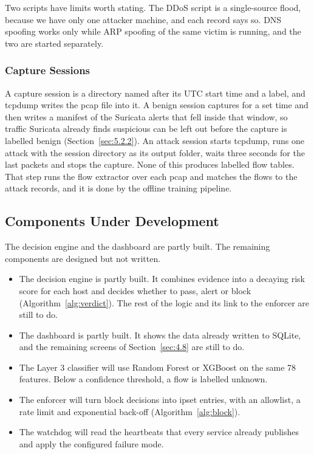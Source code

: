 \noindent Two scripts have limits worth stating. The DDoS script is a single-source flood, because we have only one attacker machine, and each record says so. DNS spoofing works only while ARP spoofing of the same victim is running, and the two are started separately.

\subsubsection{Capture Sessions}\label{sec:7.1.8.2}

\noindent A capture session is a directory named after its UTC start time and a label, and tcpdump writes the pcap file into it. A benign session captures for a set time and then writes a manifest of the Suricata alerts that fell inside that window, so traffic Suricata already finds suspicious can be left out before the capture is labelled benign (Section~\ref{sec:5.2.2}). An attack session starts tcpdump, runs one attack with the session directory as its output folder, waits three seconds for the last packets and stops the capture. None of this produces labelled flow tables. That step runs the flow extractor over each pcap and matches the flows to the attack records, and it is done by the offline training pipeline.

\subsection{Components Under Development}\label{sec:7.1.9}

\noindent The decision engine and the dashboard are partly built. The remaining components are designed but not written.

\begin{itemize}
\item
  The decision engine is partly built. It combines evidence into a decaying risk score for each host and decides whether to pass, alert or block (Algorithm~\ref{alg:verdict}). The rest of the logic and its link to the enforcer are still to do.
\item
  The dashboard is partly built. It shows the data already written to SQLite, and the remaining screens of Section~\ref{sec:4.8} are still to do.
\item
  The Layer 3 classifier will use Random Forest or XGBoost on the same 78 features. Below a confidence threshold, a flow is labelled unknown.
\item
  The enforcer will turn block decisions into ipset entries, with an allowlist, a rate limit and exponential back-off (Algorithm~\ref{alg:block}).
\item
  The watchdog will read the heartbeats that every service already publishes and apply the configured failure mode.
\end{itemize}

